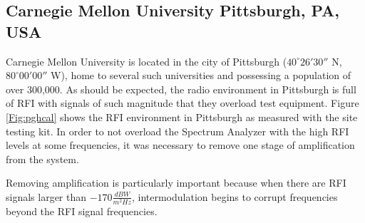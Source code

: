 \subsection{Carnegie Mellon University Pittsburgh, PA, USA}

Carnegie Mellon University is located in the city of Pittsburgh ($40^\circ 26'30''$ N, $80^\circ 00' 00''$ W), home to several such universities and possessing a population of over 300,000. As should be expected, the radio environment in Pittsburgh is full of RFI with signals of such magnitude that they overload test equipment. Figure \ref{Fig:pghcal} shows the RFI environment in Pittsburgh as measured with the site testing kit. In order to not overload the Spectrum Analyzer with the high RFI levels at some frequencies, it was necessary to remove one stage of amplification from the system. 

Removing amplification is particularly important because when there are RFI signals larger than $-170 \frac{dBW}{m^2 Hz}$, intermodulation begins to corrupt frequencies beyond the RFI signal frequencies. 


